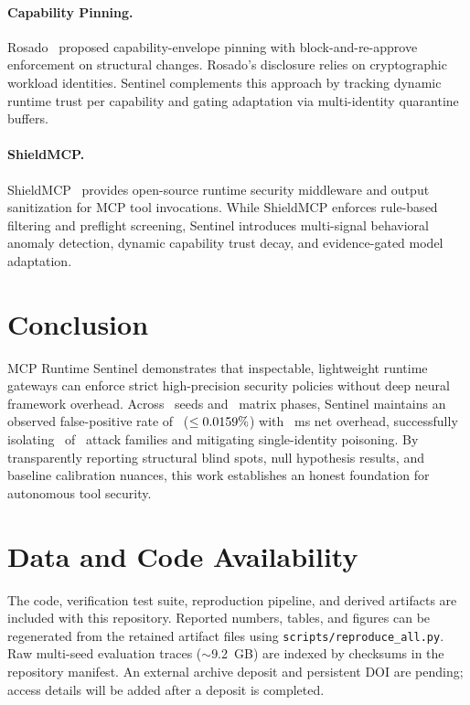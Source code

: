 \documentclass{llncs}
\begin{document}
\paragraph{Capability Pinning.} Rosado~\cite{rosado2026pinning} proposed capability-envelope pinning with block-and-re-approve enforcement on structural changes. Rosado's disclosure relies on cryptographic workload identities. Sentinel complements this approach by tracking dynamic runtime trust per capability and gating adaptation via multi-identity quarantine buffers.

\paragraph{ShieldMCP.} ShieldMCP~\cite{shieldmcp2026} provides open-source runtime security middleware and output sanitization for MCP tool invocations. While ShieldMCP enforces rule-based filtering and preflight screening, Sentinel introduces multi-signal behavioral anomaly detection, dynamic capability trust decay, and evidence-gated model adaptation.

\section{Conclusion}
\label{sec:conclusion}
MCP Runtime Sentinel demonstrates that inspectable, lightweight runtime gateways can enforce strict high-precision security policies without deep neural framework overhead. Across \NoveltySeedsCount\ seeds and \NoveltyPhasesCount\ matrix phases, Sentinel maintains an observed false-positive rate of \SentinelObservedFPR\ ($\le 0.0159\%$) with \ProxyOverheadMs~ms net overhead, successfully isolating \DetectedAttackFamilies\ of \TotalAttackFamilies\ attack families and mitigating single-identity poisoning. By transparently reporting structural blind spots, null hypothesis results, and baseline calibration nuances, this work establishes an honest foundation for autonomous tool security.

\section*{Data and Code Availability}
The code, verification test suite, reproduction pipeline, and derived artifacts are included with this repository. Reported numbers, tables, and figures can be regenerated from the retained artifact files using \texttt{scripts/reproduce\_all.py}. Raw multi-seed evaluation traces ($\sim$9.2~GB) are indexed by checksums in the repository manifest. An external archive deposit and persistent DOI are pending; access details will be added after a deposit is completed.

\providecommand{\refname}{References}
\renewcommand{\refname}{References}


\end{document}
